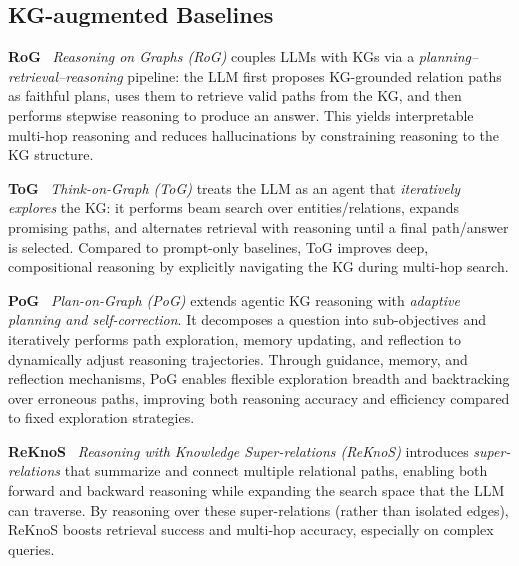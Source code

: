 

\subsection{KG-augmented Baselines}

\noindent \textbf{RoG}~\citep{Luo2024RoG}
\emph{Reasoning on Graphs (RoG)} couples LLMs with KGs via a \emph{planning–retrieval–reasoning} pipeline: the LLM first proposes KG-grounded relation paths as faithful plans, uses them to retrieve valid paths from the KG, and then performs stepwise reasoning to produce an answer. This yields interpretable multi-hop reasoning and reduces hallucinations by constraining reasoning to the KG structure. 

\noindent \textbf{ToG}~\citep{Sun2024ToG}
\emph{Think-on-Graph (ToG)} treats the LLM as an agent that \emph{iteratively explores} the KG: it performs beam search over entities/relations, expands promising paths, and alternates retrieval with reasoning until a final path/answer is selected. Compared to prompt-only baselines, ToG improves deep, compositional reasoning by explicitly navigating the KG during multi-hop search. 

\noindent \textbf{PoG}~\citep{Chen2024Pog}
\emph{Plan-on-Graph (PoG)} extends agentic KG reasoning with \emph{adaptive planning and self-correction}. It decomposes a question into sub-objectives and iteratively performs path exploration, memory updating, and reflection to dynamically adjust reasoning trajectories. Through guidance, memory, and reflection mechanisms, PoG enables flexible exploration breadth and backtracking over erroneous paths, improving both reasoning accuracy and efficiency compared to fixed exploration strategies.

\noindent \textbf{ReKnoS}~\citep{Wang2025ReKnoS}
\emph{Reasoning with Knowledge Super-relations (ReKnoS)} introduces \emph{super-relations} that summarize and connect multiple relational paths, enabling both forward and backward reasoning while expanding the search space that the LLM can traverse. By reasoning over these super-relations (rather than isolated edges), ReKnoS boosts retrieval success and multi-hop accuracy, especially on complex queries.






















